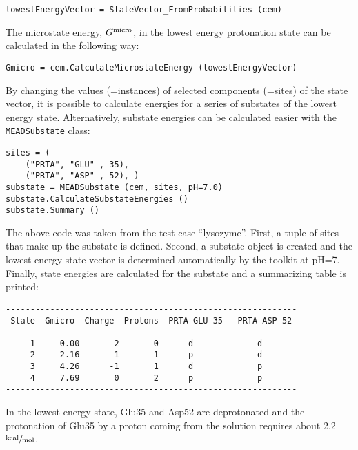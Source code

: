 \documentclass[12pt]{article}
\newcommand{\kcal}{$\sfrac{\rm kcal}{\rm mol}$\xspace}
\begin{document}
{{\footnotesize \singlespacing \begin{lstlisting}
lowestEnergyVector = StateVector_FromProbabilities (cem)
\end{lstlisting} }

\bigskip
The microstate energy,
$G^{\rm micro}$,
in the lowest energy protonation state can
be calculated in the following way:

{\footnotesize \singlespacing \begin{lstlisting}
Gmicro = cem.CalculateMicrostateEnergy (lowestEnergyVector)
\end{lstlisting} }

\bigskip
By changing the values (=instances) of selected components (=sites) of the state vector,
it is possible to calculate energies for a series of substates of
the lowest energy state.
%
Alternatively,
substate energies can be calculated easier with the \texttt{MEADSubstate} class:

{\footnotesize \singlespacing \begin{lstlisting}
sites = (
    ("PRTA", "GLU" , 35),
    ("PRTA", "ASP" , 52), )
substate = MEADSubstate (cem, sites, pH=7.0)
substate.CalculateSubstateEnergies ()
substate.Summary ()
\end{lstlisting} }

\bigskip
The above code was taken from the test case ``lysozyme''.
%
First,
a tuple of sites that make up the substate is defined.
%
Second,
a substate object is created and the lowest energy state vector is determined
automatically by the toolkit at pH=7.
%
Finally,
state energies are calculated for the substate and a summarizing table is
printed:

{\footnotesize \singlespacing \begin{lstlisting}
-----------------------------------------------------------
 State  Gmicro  Charge  Protons  PRTA GLU 35   PRTA ASP 52
-----------------------------------------------------------
     1     0.00      -2       0      d             d
     2     2.16      -1       1      p             d
     3     4.26      -1       1      d             p
     4     7.69       0       2      p             p
-----------------------------------------------------------
\end{lstlisting} }

\bigskip
In the lowest energy state,
Glu35 and Asp52 are deprotonated
and the protonation of Glu35 by a proton coming from the solution
requires about 2.2 \kcal.


}
\end{document}
